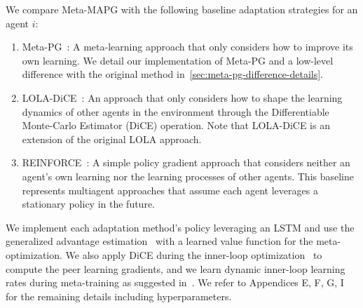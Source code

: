 \noindent{}
We compare Meta-MAPG with the following baseline adaptation strategies for an agent $i$:
\begin{enumerate}[wide, labelindent=0pt, label=\arabic*), topsep=0pt]
    \itemsep 0pt
    \item Meta-PG~\citep{alshedivat2018continuous}: A meta-learning approach that only considers how to improve its own learning. We detail our implementation of Meta-PG and a low-level difference with the original method in~\cref{sec:meta-pg-difference-details}.
    \item LOLA-DiCE~\citep{foerster2018dice}: 
    An approach that only considers how to shape the learning dynamics of other agents in the environment through the Differentiable Monte-Carlo Estimator (DiCE) operation. Note that LOLA-DiCE is an extension of the original LOLA approach.
    \item REINFORCE~\citep{Williams1992}: A simple policy gradient approach that considers neither an agent's own learning nor the learning processes of other agents. This baseline represents multiagent approaches that assume each agent leverages a stationary policy in the future. 
\end{enumerate}

\noindent{}
We implement each adaptation method's policy leveraging an LSTM and use the generalized advantage estimation~\citep{schulmanetal-16-gae} with a learned value function for the meta-optimization. 
We also apply DiCE during the inner-loop optimization~\citep{foerster2018dice} to compute the peer learning gradients, and we learn dynamic inner-loop learning rates during meta-training as suggested in~\citet{alshedivat2018continuous}.
We refer to Appendices E, F, G, I for the remaining details including hyperparameters.

